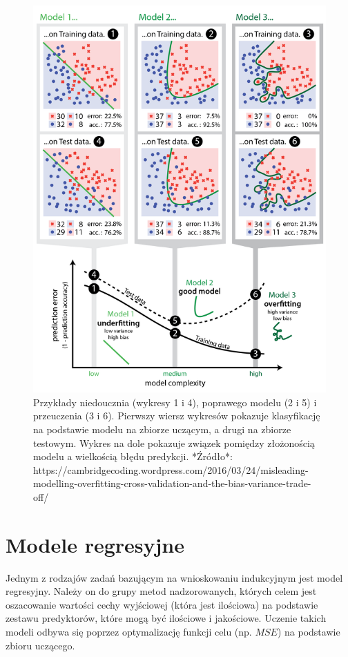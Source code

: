 \documentclass[
]{book}
\theoremstyle{plain}
\theoremstyle{definition}
\theoremstyle{definition}
\theoremstyle{definition}
\theoremstyle{definition}
\theoremstyle{remark}
\begin{document}
\begin{figure}
\includegraphics[width=6.1in]{images/unde_over_fitting} \caption{Przykłady niedoucznia (wykresy 1 i 4), poprawego modelu (2 i 5) i przeuczenia (3 i 6). Pierwszy wiersz wykresów pokazuje klasyfikację na podstawie modelu na zbiorze uczącym, a drugi na zbiorze testowym. Wykres na dole pokazuje związek pomiędzy złożonością modelu a wielkością błędu predykcji. *Źródło*: https://cambridgecoding.wordpress.com/2016/03/24/misleading-modelling-overfitting-cross-validation-and-the-bias-variance-trade-off/}\label{fig:unnamed-chunk-10}
\end{figure}

\hypertarget{modele-regresyjne}{%
\section{Modele regresyjne}\label{modele-regresyjne}}

Jednym z rodzajów zadań bazującym na wnioskowaniu indukcyjnym jest model regresyjny. Należy on do grupy metod nadzorowanych, których celem jest oszacowanie wartości cechy wyjściowej (która jest ilościowa) na podstawie zestawu predyktorów, które mogą być ilościowe i jakościowe. Uczenie takich modeli odbywa się poprzez optymalizację funkcji celu (np. \(MSE\)) na podstawie zbioru uczącego.
\end{document}
